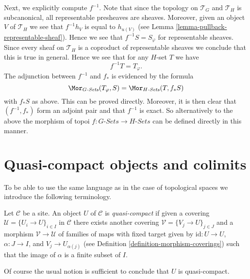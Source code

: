 \medskip\noindent
Next, we explicitly compute $f^{-1}$. Note that since the topology
on $\mathcal{T}_G$ and $\mathcal{T}_H$ is subcanonical, all representable
presheaves are sheaves. Moreover, given an object $V$ of $\mathcal{T}_H$
we see that $f^{-1}h_V$ is equal to $h_{u(V)}$ (see
Lemma \ref{lemma-pullback-representable-sheaf}). Hence we see that
$f^{-1}S = S_\varphi$ for representable sheaves. Since every sheaf on
$\mathcal{T}_H$ is a coproduct of representable sheaves we conclude that
this is true in general. Hence we see that
for any $H$-set $T$ we have
$$
f^{-1}T = T_\varphi.
$$
The adjunction between $f^{-1}$ and $f_*$ is evidenced by the formula
$$
\Mor_{G\textit{-Sets}}(T_\varphi, S) =
\Mor_{H\textit{-Sets}}(T, f_*S)
$$
with $f_*S$ as above. This can be proved directly. Moreover, it is then clear
that $(f^{-1}, f_*)$ form an adjoint pair and that $f^{-1}$ is exact.
So alternatively to the above the morphism of topoi
$f : G\textit{-Sets} \to H\textit{-Sets}$ can be defined directly in this
manner.













\section{Quasi-compact objects and colimits}
\label{section-quasi-compact}

\noindent
To be able to use the same language as in the case of topological spaces
we introduce the following terminology.

\begin{definition}
\label{definition-quasi-compact}
Let $\mathcal{C}$ be a site. An object $U$ of $\mathcal{C}$ is
{\it quasi-compact} if given a covering $\mathcal{U} = \{U_i \to U\}_{i \in I}$
in $\mathcal{C}$ there exists another covering
$\mathcal{V} = \{V_j \to U\}_{j \in J}$ and a morphism
$\mathcal{V} \to \mathcal{U}$ of families of maps with fixed target
given by $\text{id} : U \to U$, $\alpha : J \to I$, and $V_j \to U_{\alpha(j)}$
(see Definition \ref{definition-morphism-coverings})
such that the image of $\alpha$ is a finite subset of $I$.
\end{definition}

\noindent
Of course the usual notion is sufficient to conclude that
$U$ is quasi-compact.

